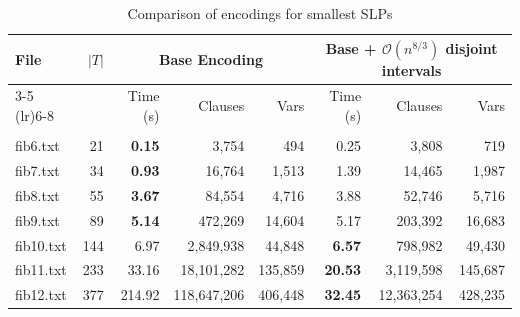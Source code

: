 \documentclass[11pt]{article}
\renewcommand{\O}{\mathcal{O}}
\begin{document}
\begin{table}
  \centering
  \caption{Comparison of encodings for smallest SLPs}
  \begin{tabular}{lrrrrrrr}
    \toprule
    \multirow{2}{*}{File} & \multirow{2}{*}{$|T|$} & \multicolumn{3}{c}{Base Encoding} & \multicolumn{3}{c}{Base + $\O(n^{8/3})$ disjoint intervals} \\
    \cmidrule(lr){3-5} \cmidrule(lr){6-8}
    & &  Time (s) & Clauses & Vars &  Time (s) & Clauses & Vars \\
    \midrule
    \multicolumn{8}{l}{} \\
    fib6.txt & 21 & \textbf{0.15} & 3,754 & 494 & 0.25 & 3,808 & 719 \\
    fib7.txt & 34 & \textbf{0.93} & 16,764 & 1,513 & 1.39 & 14,465 & 1,987 \\
    fib8.txt & 55 & \textbf{3.67} & 84,554 & 4,716 & 3.88 & 52,746 & 5,716 \\
    fib9.txt & 89 & \textbf{5.14} & 472,269 & 14,604 & 5.17 & 203,392 & 16,683 \\
    fib10.txt & 144 & 6.97 & 2,849,938 & 44,848 & \textbf{6.57} & 798,982 & 49,430  \\
    fib11.txt & 233 & 33.16 & 18,101,282 & 135,859 & \textbf{20.53} & 3,119,598 & 145,687  \\
    fib12.txt & 377 & 214.92 &  118,647,206 & 406,448 & \textbf{32.45} & 12,363,254 &  428,235\\


\end{tabular}
\end{table}
\end{document}
